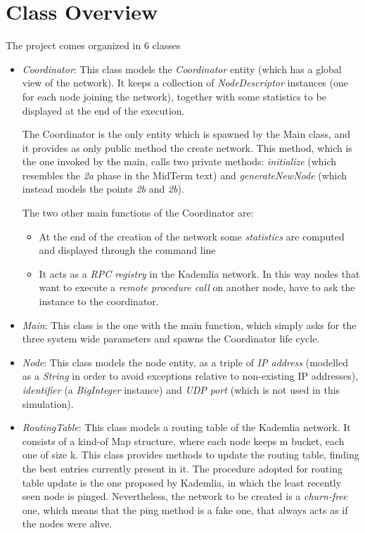 \documentclass[11pt, a4paper]{report}
\begin{document}
\section*{Class Overview}
	The project comes organized in 6 classes
	\begin{itemize}
		\item \emph{Coordinator}: This class models the \emph{Coordinator} entity (which has a global view of the network). It keeps a collection of \emph{NodeDescriptor} instances (one for each node joining the network), together with some statistics to be displayed at the end of the execution. 
		\par
		The Coordinator is the only entity which is spawned by the Main class, and it provides as only public method the create network. This method, which is the one invoked by the main, calls two private methods: \emph{initialize} (which resembles the \emph{2a} phase in the MidTerm text) and \emph{generateNewNode} (which instead models the points \emph{2b} and \emph{2b}). 
		\par 
		The two other main functions of the Coordinator are:
		\begin{itemize}
			\item At the end of the creation of the network some \emph{statistics} are computed and displayed through the command line
			\item It acts as a \emph{RPC registry} in the Kademlia network. In this way nodes that want to execute a \emph{remote procedure call} on another node, have to ask the instance to the coordinator.
		\end{itemize}
		\item \emph{Main}: This class is the one with the main function, which simply asks for the three system wide parameters and spawns the Coordinator life cycle.
		\item \emph{Node}: This class models the node entity, as a triple of \emph{IP address} (modelled as a \emph{String} in order to avoid exceptions relative to non-existing IP addresses), \emph{identifier} (a \emph{BigInteger} instance) and \emph{UDP port} (which is not used in this simulation). 
		\item \emph{RoutingTable}: This class models a routing table of the Kademlia network. It consists of a kind-of Map structure, where each node keeps m bucket, each one of size k. This class provides methods to update the routing table, finding the best entries currently present in it. The procedure adopted for routing table update is the one proposed by Kademlia, in which the least recently seen node is pinged. Nevertheless, the network to be created is a \emph{churn-free} one, which means that the ping method is a fake one, that always acts as if the nodes were alive. 

\end{itemize}
\end{document}
